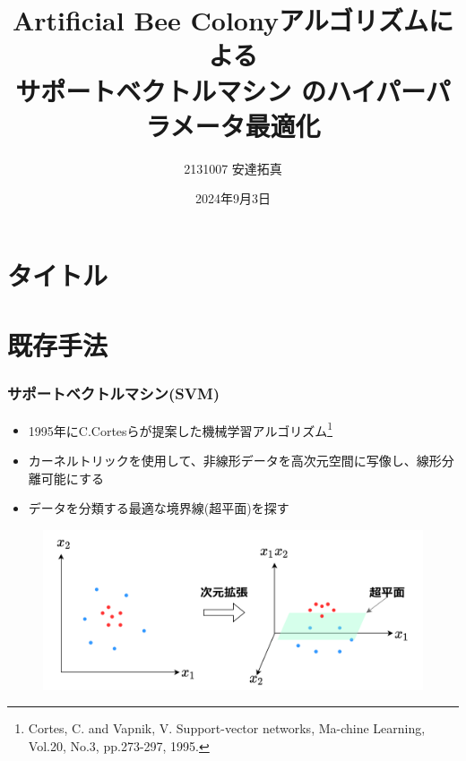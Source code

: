 \documentclass[11pt,dvipdfmx,cjk]{beamer}
\title{Artificial Bee Colonyアルゴリズムによる\\サポートベクトルマシン
のハイパーパラメータ最適化}
\author{2131007 安達拓真}
\institute{千葉工業大学 情報科学部 情報工学科 4年 安達拓真}
\date{2024年9月3日}
\begin{document}

\section{タイトル}
\begin{frame}
\maketitle
\end{frame}

\section{既存手法} %
\begin{frame}
\frametitle{サポートベクトルマシン(SVM)}
\begin{itemize}
    \item 1995年にC.Cortesらが提案した機械学習アルゴリズム\footnote{ Cortes, C. and Vapnik, V. Support-vector networks, Ma-chine Learning, Vol.20, No.3, pp.273-297, 1995.}
    \item カーネルトリックを使用して、非線形データを高次元空間に写像し、線形分離可能にする 
    \item データを分類する最適な境界線(超平面)を探す                
  \end{itemize}
  \begin{figure}
    \centering
    \includegraphics[width=0.8\linewidth]{syazou.png}
   \end{figure}
\end{frame}
\end{document}
